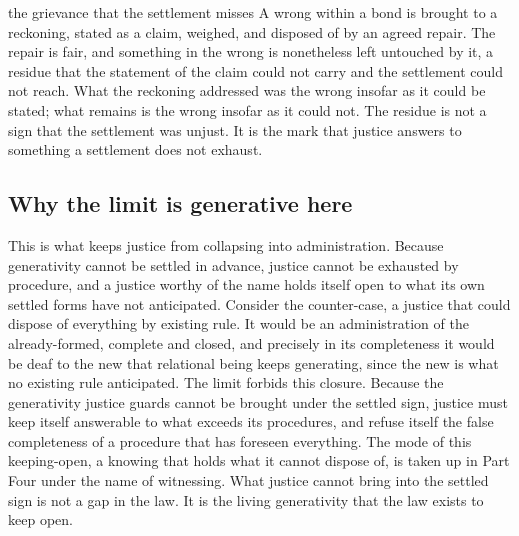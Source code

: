 \begin{casebox}{the grievance that the settlement misses}
A wrong within a bond is brought to a reckoning, stated as a claim, weighed, and disposed of by an agreed repair. The repair is fair, and something in the wrong is nonetheless left untouched by it, a residue that the statement of the claim could not carry and the settlement could not reach. What the reckoning addressed was the wrong insofar as it could be stated; what remains is the wrong insofar as it could not. The residue is not a sign that the settlement was unjust. It is the mark that justice answers to something a settlement does not exhaust.
\end{casebox}

\subsection*{Why the limit is generative here}

This is what keeps justice from collapsing into administration. Because generativity cannot be settled in advance, justice cannot be exhausted by procedure, and a justice worthy of the name holds itself open to what its own settled forms have not anticipated. Consider the counter-case, a justice that could dispose of everything by existing rule. It would be an administration of the already-formed, complete and closed, and precisely in its completeness it would be deaf to the new that relational being keeps generating, since the new is what no existing rule anticipated. The limit forbids this closure. Because the generativity justice guards cannot be brought under the settled sign, justice must keep itself answerable to what exceeds its procedures, and refuse itself the false completeness of a procedure that has foreseen everything. The mode of this keeping-open, a knowing that holds what it cannot dispose of, is taken up in Part Four under the name of witnessing. What justice cannot bring into the settled sign is not a gap in the law. It is the living generativity that the law exists to keep open.
